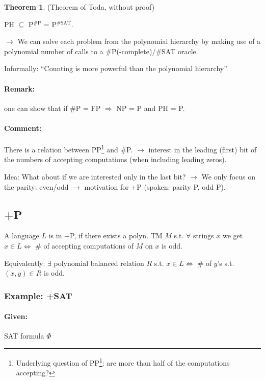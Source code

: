 \documentclass[11pt]{article}
\theoremstyle{definition}
\newtheorem{theorem}{Theorem}[section]
\theoremstyle{definition}
\begin{document}
\begin{theorem} (Theorem of Toda, without proof)

PH $ \subseteq $ P$^{\text{\#P}}$ = P$^{\text{\#SAT}}$.

\end{theorem}

$ \rightarrow $ We can solve each problem from the polynomial hierarchy by making use of a polynomial number of calls to a \#P(-complete)/\#SAT oracle.

Informally: ``Counting is more powerful than the polynomial hierarchy''

\paragraph{Remark:} one can show that if \#P = FP $ \Rightarrow $ NP = P and PH = P.

\paragraph{Comment:} There is a relation between PP\footnote{Underlying question of PP\footnote{here we want to know all bits}: are more than half of the computations accepting?} and \#P. $ \rightarrow $ interest in the leading (first) bit of the numbers of accepting computations (when including leading zeros).

Idea: What about if we are interested only in the last bit? $ \rightarrow $ We only focus on the parity: even/odd $ \rightarrow $ motivation for +P (spoken: parity P, odd P).

\subsection{+P}
A language $ L $ is in +P, if there exists a polyn. TM $ M $ s.t. $ \forall $ strings $ x $ we get $ x \in L \Leftrightarrow $ \# of accepting computations of $ M $ on $ x $ is odd.

Equivalently: $ \exists $ polynomial balanced relation $ R $ s.t. $ x \in L \Leftrightarrow $ \# of $y $'s s.t. $ (x, y) \in R $ is odd.

\subsubsection{Example: +SAT}
\paragraph{Given:} SAT formula $ \Phi $
\end{document}
